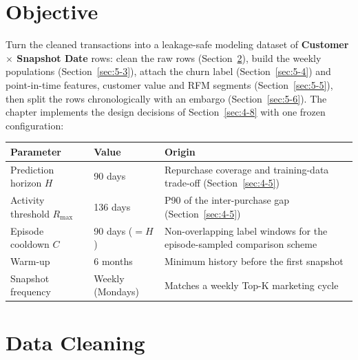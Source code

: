 \section{Objective}
\label{sec:5-1}

Turn the cleaned transactions into a leakage-safe modeling dataset of \textbf{Customer $\times$ Snapshot Date} rows: clean the raw rows (Section~\ref{sec:5-2}), build the weekly populations (Section~\ref{sec:5-3}), attach the churn label (Section~\ref{sec:5-4}) and point-in-time features, customer value and RFM segments (Section~\ref{sec:5-5}), then split the rows chronologically with an embargo (Section~\ref{sec:5-6}). The chapter implements the design decisions of Section~\ref{sec:4-8} with one frozen configuration:

\begin{center}
\begin{tabular}{@{}p{5.2cm}p{2.6cm}p{6.3cm}@{}}
    \toprule
    Parameter & Value & Origin \\
    \midrule
    Prediction horizon $H$ & 90 days & Repurchase coverage and training-data trade-off (Section~\ref{sec:4-5}) \\
    Activity threshold $R_{\max}$ & 136 days & P90 of the inter-purchase gap (Section~\ref{sec:4-5}) \\
    Episode cooldown $C$ & 90 days ($= H$) & Non-overlapping label windows for the episode-sampled comparison scheme \\
    Warm-up & 6 months & Minimum history before the first snapshot \\
    Snapshot frequency & Weekly (Mondays) & Matches a weekly Top-K marketing cycle \\
    \bottomrule
\end{tabular}
\end{center}

\section{Data Cleaning}
\label{sec:5-2}

